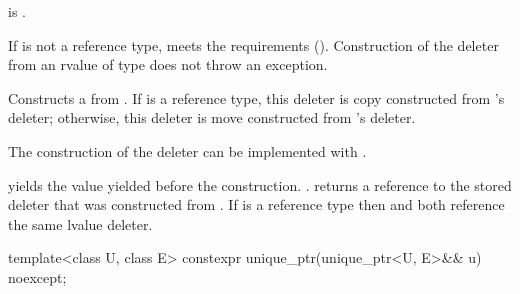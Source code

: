 \begin{itemdescr}
\pnum
\constraints
{} is .

\pnum
\expects
If  is not a reference type,
 meets the 
requirements ().
Construction
of the deleter from an rvalue of type  does not
throw an exception.

\pnum
\effects
Constructs a  from
. If  is a reference type, this
deleter is copy constructed from 's deleter; otherwise, this
deleter is move constructed from 's deleter.
\begin{note}
The
construction of the deleter can be implemented with .
\end{note}

\pnum
\ensures
{} yields the value 
yielded before the construction. .
 returns a reference
to the stored deleter that was constructed from
. If  is a reference type then
 and  both reference
the same lvalue deleter.
\end{itemdescr}

%
\begin{itemdecl}
template<class U, class E> constexpr unique_ptr(unique_ptr<U, E>&& u) noexcept;
\end{itemdecl}

